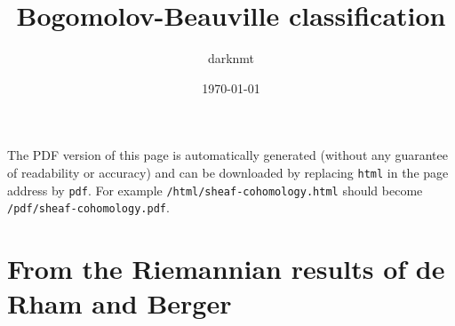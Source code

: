 \documentclass[11pt]{article}
\author{darknmt}
\date{\today}
\title{Bogomolov-Beauville classification}
\begin{document}
\maketitle
\tableofcontents

\begin{info}
The PDF version of this page is automatically generated (without any guarantee of
readability or accuracy) and can be downloaded by replacing \texttt{html} in the page address by
\texttt{pdf}. 
For example \texttt{/html/sheaf-cohomology.html} should become \texttt{/pdf/sheaf-cohomology.pdf}.
\end{info}

\section{From the Riemannian results of de Rham and Berger}
\label{sec:org8fd1336}
\end{document}
